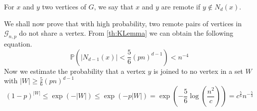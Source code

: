 \begin{definition}
	For $x$ and $y$ two vertices of $G$, we say that $x$ and $y$ are remote if $y \not\in N_d(x)$.
\end{definition}
	We shall now prove that with high probability, two remote pairs of vertices in $\mathcal{G}_{n,p}$ do not share a vertex.
	From \ref{th:KLemma} we can obtain the following equation.
	\begin{equation}
		\mathbb{P}(|N_{d-1}(x)| < \frac{5}{6}(pn)^{d-1}) < n^{-4}
	\end{equation}
	Now we estimate the probability that a vertex $y$ is joined to no vertex in a set $W$ with $|W| \geq \frac{5}{6}(pn)^{d-1}$
	\begin{equation}
	(1-p)^{|W|} \leq \exp(-|W|) \leq \exp(-p|W|) = \exp(-\frac{5}{6}\log(\frac{n^2}{c})) = c^{\frac{5}{6}}n^{-\frac{5}{3}}
	\end{equation}

